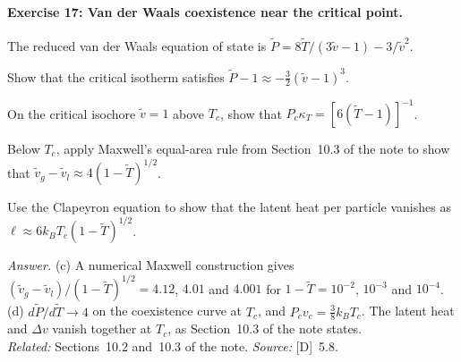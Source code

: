 \documentclass[11pt]{article}      %
\numberwithin{equation}{section}   %
\begin{document}
\paragraph{Exercise 17: Van der Waals coexistence near the critical point.}
The reduced van der Waals equation of state is $\tilde P = 8\tilde T/(3\tilde v - 1) - 3/\tilde v^2$.
\begin{parts}
    \item Show that the critical isotherm satisfies $\tilde P - 1 \approx -\tfrac32(\tilde v - 1)^3$.
    \item On the critical isochore $\tilde v = 1$ above $T_c$, show that $P_c\kappa_T = [6(\tilde T - 1)]^{-1}$.
    \item Below $T_c$, apply Maxwell's equal-area rule from Section~10.3 of the note to show that $\tilde v_g - \tilde v_l \approx 4(1 - \tilde T)^{1/2}$.
    \item Use the Clapeyron equation to show that the latent heat per particle vanishes as $\ell \approx 6k_BT_c(1 - \tilde T)^{1/2}$.
\end{parts}
\textit{Answer.} (c) A numerical Maxwell construction gives $(\tilde v_g - \tilde v_l)/(1 - \tilde T)^{1/2} = 4.12$, $4.01$ and $4.001$ for $1 - \tilde T = 10^{-2}$, $10^{-3}$ and $10^{-4}$. (d) $d\tilde P/d\tilde T \to 4$ on the coexistence curve at $T_c$, and $P_cv_c = \tfrac38k_BT_c$. The latent heat and $\Delta v$ vanish together at $T_c$, as Section~10.3 of the note states.\\
\textit{Related:} Sections~10.2 and~10.3 of the note. \textit{Source:} [D]~5.8.
\end{document}
